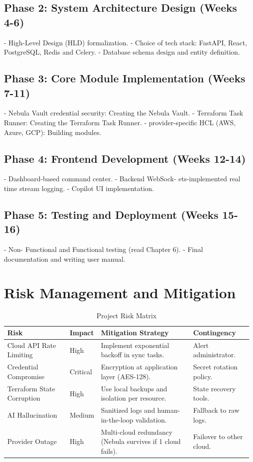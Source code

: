 \subsection{Phase 2: System Architecture Design (Weeks 4-6)}
- High-Level Design (HLD) formalization.
- Choice of tech stack: FastAPI, React, PostgreSQL, Redis and Celery.
- Database schema design and entity definition.

\subsection{Phase 3: Core Module Implementation (Weeks 7-11)}
- Nebula Vault credential security: Creating the Nebula Vault.
- Terraform Task Runner: Creating the Terraform Task Runner. 
- provider-specific HCL (AWS, Azure, GCP): Building modules.

\subsection{Phase 4: Frontend Development (Weeks 12-14)}
- Dashboard-based command center.
- Backend WebSock- ets-implemented real time stream logging.
- Copilot UI implementation.

\subsection{Phase 5: Testing and Deployment (Weeks 15-16)}
- Non- Functional and Functional testing (read Chapter 6).
- Final documentation and writing user manual.

\section{Risk Management and Mitigation}

\begin{table}
\centering
\caption{Project Risk Matrix}
\label{tab:risk_matrix}
\begin{tabular}{|p{3cm}|p{1.5cm}|p{4.5cm}|p{3.5cm}|}
\hline
\textbf{Risk} & \textbf{Impact} & \textbf{Mitigation Strategy} & \textbf{Contingency} \\ \hline
Cloud API Rate Limiting & High & Implement exponential backoff in sync tasks. & Alert administrator. \\ \hline
Credential Compromise & Critical & Encryption at application layer (AES-128). & Secret rotation policy. \\ \hline
Terraform State Corruption & High & Use local backups and isolation per resource. & State recovery tools. \\ \hline
AI Hallucination & Medium & Sanitized logs and human-in-the-loop validation. & Fallback to raw logs. \\ \hline
Provider Outage & High & Multi-cloud redundancy (Nebula survives if 1 cloud fails). & Failover to other cloud. \\ \hline
\end{tabular}
\end{table}

